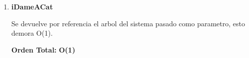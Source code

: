 \vspace*{1em}
\begin{enumerate}








\item\textbf{iDameACat}
\par Se devuelve por referencia el arbol del sistema pasado como parametro, esto demora O(1).
\par\textbf{Orden Total:} \textbf{O(1)}


\end{enumerate}

